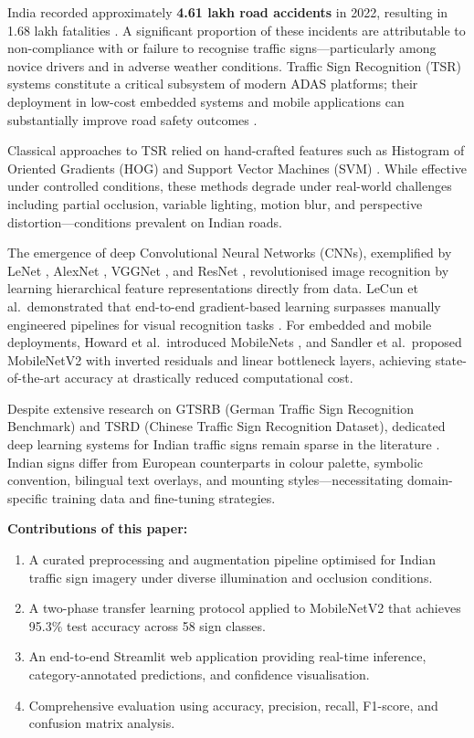 \documentclass[journal,10pt,twocolumn]{IEEEtran}
\begin{document}
India recorded approximately \textbf{4.61 lakh road accidents} in 2022,
resulting in 1.68 lakh fatalities \cite{morth2023}. A significant proportion
of these incidents are attributable to non-compliance with or failure to
recognise traffic signs—particularly among novice drivers and in adverse
weather conditions. Traffic Sign Recognition (TSR) systems constitute a
critical subsystem of modern ADAS platforms; their deployment in low-cost
embedded systems and mobile applications can substantially improve road safety
outcomes \cite{zhu2016traffic}.

Classical approaches to TSR relied on hand-crafted features such as
Histogram of Oriented Gradients (HOG) \cite{dalal2005histograms} and
Support Vector Machines (SVM) \cite{stallkamp2012man}. While effective under
controlled conditions, these methods degrade under real-world challenges
including partial occlusion, variable lighting, motion blur, and perspective
distortion—conditions prevalent on Indian roads.

The emergence of deep Convolutional Neural Networks (CNNs), exemplified by
LeNet \cite{lecun1998gradient}, AlexNet \cite{krizhevsky2012imagenet},
VGGNet \cite{simonyan2014very}, and ResNet \cite{he2016deep}, revolutionised
image recognition by learning hierarchical feature representations directly
from data. LeCun et al.\ demonstrated that end-to-end gradient-based learning
surpasses manually engineered pipelines for visual recognition tasks
\cite{lecun1998gradient}. For embedded and mobile deployments, Howard et
al.\ introduced MobileNets \cite{howard2017mobilenets}, and Sandler et al.\
proposed MobileNetV2 \cite{sandler2018mobilenetv2} with inverted residuals and
linear bottleneck layers, achieving state-of-the-art accuracy at drastically
reduced computational cost.

Despite extensive research on GTSRB (German Traffic Sign Recognition Benchmark)
\cite{stallkamp2012man} and TSRD (Chinese Traffic Sign Recognition Dataset),
dedicated deep learning systems for Indian traffic signs remain sparse in the
literature \cite{mathew2021indian}. Indian signs differ from European
counterparts in colour palette, symbolic convention, bilingual text overlays,
and mounting styles—necessitating domain-specific training data and
fine-tuning strategies.

\textbf{Contributions of this paper:}
\begin{enumerate}[leftmargin=*, nosep]
  \item A curated preprocessing and augmentation pipeline optimised for Indian
        traffic sign imagery under diverse illumination and occlusion conditions.
  \item A two-phase transfer learning protocol applied to MobileNetV2 that
        achieves 95.3\% test accuracy across 58 sign classes.
  \item An end-to-end Streamlit web application providing real-time inference,
        category-annotated predictions, and confidence visualisation.
  \item Comprehensive evaluation using accuracy, precision, recall, F1-score,
        and confusion matrix analysis.
\end{enumerate}
\end{document}
